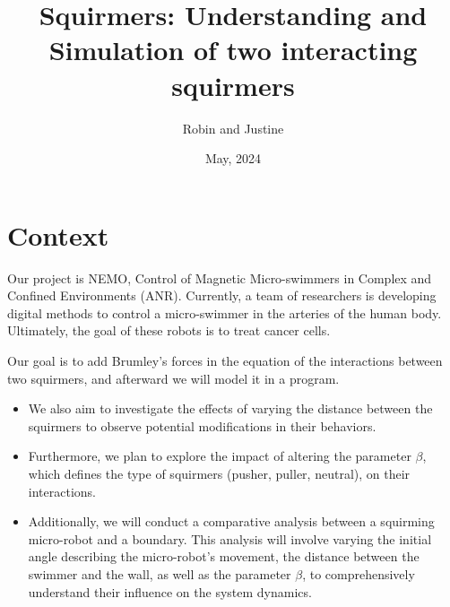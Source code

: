 \documentclass[options]{article}
\begin{document}
\title{Squirmers: Understanding and Simulation of two interacting squirmers}
\author{Robin and Justine}
\date{May, 2024}
\maketitle

\section{Context}
Our project is NEMO, Control of Magnetic Micro-swimmers in Complex and Confined Environments (ANR).
Currently, a team of researchers is developing digital methods to control a micro-swimmer in the arteries
of the human body.
Ultimately, the goal of these robots is to treat cancer cells.

\vspace{0.5cm}
Our goal is to add Brumley's forces in the equation of the interactions between two squirmers, 
and afterward we will model it in a program. 
\begin{itemize}
    \item We also aim to investigate the effects of varying the distance between the squirmers to observe
    potential modifications in their behaviors.
    \item Furthermore, we plan to explore the impact of altering the parameter $\beta$, which defines the
    type of squirmers (pusher, puller, neutral), on their interactions.
    \item Additionally, we will conduct a comparative analysis between a squirming micro-robot and a 
    boundary. This analysis will involve varying the initial angle describing the micro-robot's 
    movement, the distance between the swimmer and the wall, as well as the parameter $\beta$, 
    to comprehensively understand their influence on the system dynamics.
\end{itemize}
\end{document}
